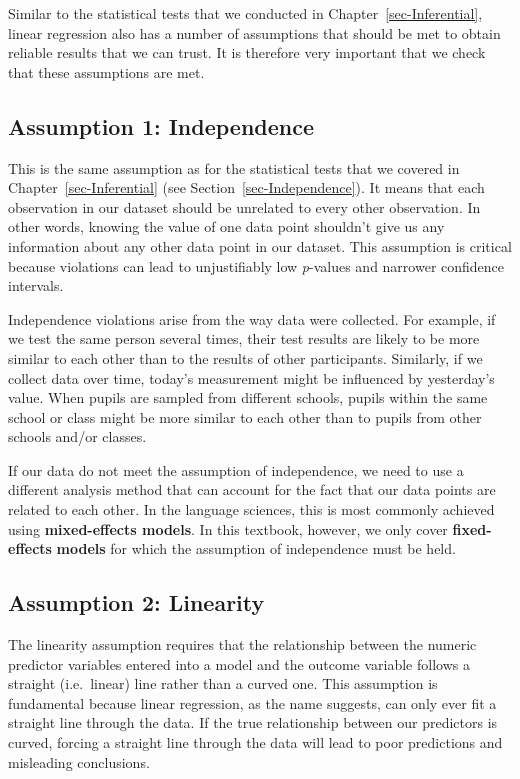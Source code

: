 \documentclass[
  letterpaper,
  DIV=11,
  numbers=noendperiod]{scrreprt}
\begin{document}
Similar to the statistical tests that we conducted in
Chapter~\ref{sec-Inferential}, linear regression also has a number of
assumptions that should be met to obtain reliable results that we can
trust. It is therefore very important that we check that these
assumptions are met.

\subsection{Assumption 1: Independence}\label{sec-IndependenceSLR}

This is the same assumption as for the statistical tests that we covered
in Chapter~\ref{sec-Inferential} (see Section~\ref{sec-Independence}).
It means that each observation in our dataset should be unrelated to
every other observation. In other words, knowing the value of one data
point shouldn't give us any information about any other data point in
our dataset. This assumption is critical because violations can lead to
unjustifiably low \emph{p}-values and narrower confidence intervals.

Independence violations arise from the way data were collected. For
example, if we test the same person several times, their test results
are likely to be more similar to each other than to the results of other
participants. Similarly, if we collect data over time, today's
measurement might be influenced by yesterday's value. When pupils are
sampled from different schools, pupils within the same school or class
might be more similar to each other than to pupils from other schools
and/or classes.

If our data do not meet the assumption of independence, we need to use a
different analysis method that can account for the fact that our data
points are related to each other. In the language sciences, this is most
commonly achieved using \textbf{mixed-effects models}. In this textbook,
however, we only cover \textbf{fixed-effects} \textbf{models} for which
the assumption of independence must be held.

\subsection{Assumption 2: Linearity}\label{sec-LinearitySLR}

The linearity assumption requires that the relationship between the
numeric predictor variables entered into a model and the outcome
variable follows a straight (i.e.~linear) line rather than a curved one.
This assumption is fundamental because linear regression, as the name
suggests, can only ever fit a straight line through the data. If the
true relationship between our predictors is curved, forcing a straight
line through the data will lead to poor predictions and misleading
conclusions.
\end{document}
